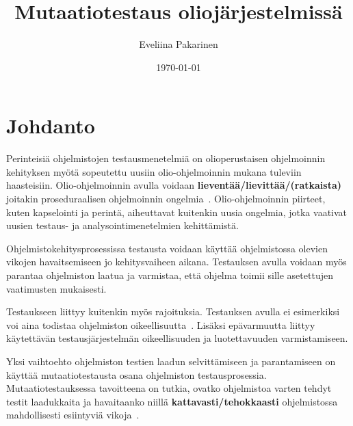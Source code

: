\documentclass[finnish, grading]{tktltiki2}
\title{Mutaatiotestaus oliojärjestelmissä}
\author{Eveliina Pakarinen}
\date{\today}
\theoremstyle{definition}
\theoremstyle{remark}
\begin{document}

\frontmatter      %

\maketitle        %
\makeabstract     %

\tableofcontents  %


\mainmatter       %




\section{Johdanto}

Perinteisiä ohjelmistojen testausmenetelmiä on olioperustaisen ohjelmoinnin kehityksen myötä sopeutettu uusiin olio-ohjelmoinnin mukana tuleviin haasteisiin. Olio-ohjelmoinnin avulla voidaan \textbf{lieventää/lievittää/(ratkaista)} joitakin proseduraalisen ohjelmoinnin ongelmia~\cite[s. 86]{Mariani:Pezze:2008}. O\-li\-o-oh\-jel\-moin\-nin piirteet, kuten kapselointi ja perintä, aiheuttavat kuitenkin uusia ongelmia, jotka vaativat uusien testaus- ja analysointimenetelmien kehittämistä.

Ohjelmistokehitysprosessissa testausta voidaan käyttää ohjelmistossa olevien vikojen havaitsemiseen jo kehitysvaiheen aikana. Testauksen avulla voidaan myös parantaa ohjelmiston laatua ja varmistaa, että ohjelma toimii sille asetettujen vaatimusten mukaisesti. 

Testaukseen liittyy kuitenkin myös rajoituksia. Testauksen avulla ei esimerkiksi voi aina todistaa ohjelmiston oikeellisuutta~\cite[s. 58]{Binder:1999}. Lisäksi epävarmuutta liittyy käytettävän testausjärjestelmän oikeellisuuden ja luotettavuuden varmistamiseen.

Yksi vaihtoehto ohjelmiston testien laadun selvittämiseen ja parantamiseen on käyttää mutaatiotestausta osana ohjelmiston testausprosessia. Mutaatiotestauksessa tavoitteena on tutkia, ovatko ohjelmistoa varten tehdyt testit laadukkaita ja havaitaanko niillä \textbf{kattavasti/tehokkaasti} ohjelmistossa mahdollisesti esiintyviä vikoja~\cite[s. 649]{Jia:Harman:2011}. 
\end{document}
